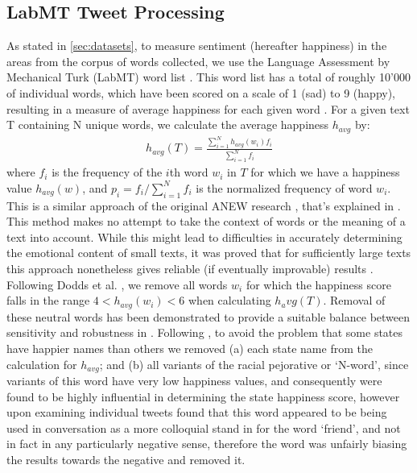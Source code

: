 \documentclass{llncs}
\begin{document}
\subsection{LabMT Tweet Processing}
As stated in \ref{sec:datasets}, to measure sentiment (hereafter happiness) in the areas from the corpus of words collected, we use the Language Assessment by Mechanical Turk (LabMT) word list \cite{Dodds2011}. This word list has a total of roughly 10'000 of individual words, which have been scored on a scale of 1 (sad) to 9 (happy), resulting in a measure of average happiness for each given word \cite{Kloumann2012}. For a given text T containing N unique words, we calculate the average happiness $h_{avg}$ by:
\begin{align*}
h_{avg}(T) = \frac{\sum_{i=1}^{N} h_{avg}(w_i)f_i}{\sum_{i=1}^{N} f_i} \tag{1}\label{eq:1}
\end{align*}
where $f_i$ is the frequency of the $i$th word $w_i$ in $T$ for which we have a happiness value $h_{avg}(w)$, and $p_i = f_i/\sum_{i=1}^{N}f_i$ is the normalized frequency of word $w_i$. This is a similar approach of the original ANEW research \cite{Bradley1999}, that's explained in \cite{Dodds2009}.
This method makes no attempt to take the context of words or the meaning of a text into account. While this might lead to difficulties in accurately determining the emotional content of small texts, it was proved that for sufficiently large texts this approach nonetheless gives reliable (if eventually improvable) results \cite{Dodds2011,Mitchell2013,Dodds2009,Kloumann2012}.
Following Dodds et al. \cite{Dodds2011}, we remove all words $w_i$ for which the happiness score falls in the range $4 < h_{avg}(w_i) < 6$ when calculating $h_avg(T)$. Removal of these neutral words has been demonstrated to provide a suitable balance between sensitivity and robustness in \cite{Dodds2011}. Following \cite{Mitchell2013}, to avoid the problem that some states have happier names than others we removed (a) each state name from the calculation for $h_{avg}$; and (b) all variants of the racial pejorative or ‘N-word’, since variants of this word have very low happiness values, and consequently were found to be highly influential in determining the state happiness score, however upon examining individual tweets \cite{Mitchell2013} found that this word appeared to be being used in conversation as a more colloquial stand in for the word `friend', and not in fact in any particularly negative sense, therefore the word was unfairly biasing \cite{Mitchell2013} the results towards the negative and removed it.
\end{document}
